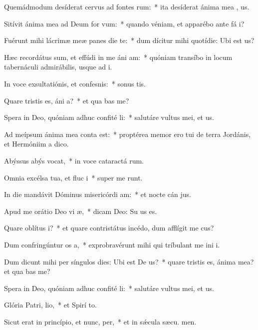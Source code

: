 \item Quemádmodum desíderat cervus ad fontes rum:~* ita desíderat ánima mea  , us.
\item Sitívit ánima mea ad Deum for vum:~* quando véniam, et apparébo ante fá i?
\item Fuérunt mihi lácrimæ meæ panes die  te:~* dum dícitur mihi quotídie: Ubi est  us?
\item Hæc recordátus sum, et effúdi in me áni am:~* quóniam transíbo in locum tabernáculi admirábilis, usque ad  i.
\item In voce exsultatiónis, et confesnis:~* sonus tis.
\item Quare tristis es, áni a?~* et qua bas me?
\item Spera in Deo, quóniam adhuc confité li:~* salutáre vultus mei, et  us.
\item Ad meípsum ánima mea conta est:~* proptérea memor ero tui de terra Jordánis, et Hermóniim a  dico.
\item Abýssus abýs vocat,~* in voce cataractá rum.
\item Omnia excélsa tua, et fluc i~* super me runt.
\item In die mandávit Dóminus misericórdi am:~* et nocte cán jus.
\item Apud me orátio Deo vi æ,~* dicam Deo: Su us es.
\item Quare oblítus  i?~* et quare contristátus incédo, dum afflígit me cus?
\item Dum confringúntur os a,~* exprobravérunt mihi qui tríbulant me ini i.
\item Dum dicunt mihi per síngulos dies: Ubi est De us?~* quare tristis es, ánima mea? et qua bas me?
\item Spera in Deo, quóniam adhuc confité li:~* salutáre vultus mei, et  us.
\item Glória Patri,  lio,~* et Spirí to.
\item Sicut erat in princípio, et nunc,  per,~* et in sǽcula sæcu. men.
